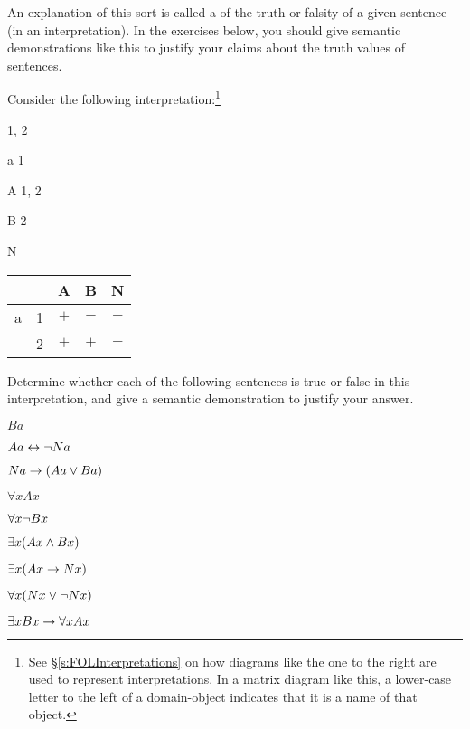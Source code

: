 An explanation of this sort is called a  of the truth or falsity of a given sentence (in an interpretation).  In the exercises below, you should give semantic demonstrations like this to justify your claims about the truth values of sentences.



\practiceproblems
\problempart
\label{pr.TorF1}
Consider the following interpretation:\footnote{See \S\ref{s:FOLInterpretations} on how diagrams like the one to the right are used to represent interpretations. In a matrix diagram like this, a lower-case letter to the left of a domain-object indicates that it is a name of that object. }


\begin{multicols}{2}
\begin{ekey}
		\item[\text{Domain}] 1, 2
		\item[a] 1
		\item[A] 1, 2
		\item[B] 2
		\item[N]
\end{ekey}
\columnbreak

\begin{tabular}{c|c|c|c|c|}
\hline
&    &   A   &   B  & N  \\ \hline
a & 1 &   $+$   &   $-$  & $-$  \\ \hline
 & 2   &   $+$   &   $+$ & $-$ \\ \hline
\end{tabular}
\end{multicols}


\noindent Determine whether each of the following sentences is true or false in this interpretation, and give a semantic demonstration to justify your answer.
\begin{earg}
\item $Ba$
\item $Aa \leftrightarrow \neg Na$
\item $Na \rightarrow (Aa \vee Ba)$
\item $\forall x Ax$
\item $\forall x \neg Bx$
\item $\exists x(Ax \wedge Bx)$
\item $\exists x(Ax \rightarrow Nx)$
\item $\forall x(Nx \vee \neg Nx)$
\item $\exists x Bx \rightarrow \forall x Ax$
\end{earg}

